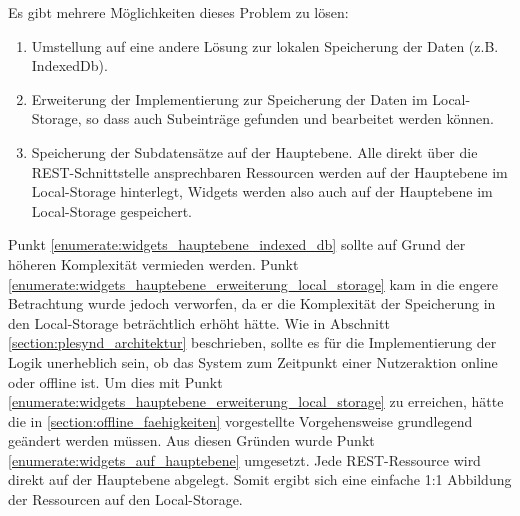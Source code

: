 Es gibt mehrere Möglichkeiten dieses Problem zu lösen:
\begin{enumerate}
 \item\label{enumerate:widgets_hauptebene_indexed_db} Umstellung auf eine andere Lösung zur lokalen Speicherung der Daten (z.B. IndexedDb).
 \item\label{enumerate:widgets_hauptebene_erweiterung_local_storage} Erweiterung der Implementierung zur Speicherung der Daten im Local-Storage, so dass auch Subeinträge gefunden und bearbeitet werden können.
 \item\label{enumerate:widgets_auf_hauptebene} Speicherung der Subdatensätze auf der Hauptebene. Alle direkt über die REST-Schnittstelle ansprechbaren Ressourcen werden auf der Hauptebene im Local-Storage hinterlegt, Widgets werden also auch auf der Hauptebene im Local-Storage gespeichert.
\end{enumerate}
Punkt \ref{enumerate:widgets_hauptebene_indexed_db} sollte auf Grund der höheren Komplexität vermieden werden. Punkt \ref{enumerate:widgets_hauptebene_erweiterung_local_storage} kam in die engere Betrachtung wurde jedoch verworfen, da er die Komplexität der Speicherung in den Local-Storage beträchtlich erhöht hätte. Wie in Abschnitt \ref{section:plesynd_architektur} beschrieben, sollte es für die Implementierung der Logik unerheblich sein, ob das System zum Zeitpunkt einer Nutzeraktion online oder offline ist. Um dies mit Punkt \ref{enumerate:widgets_hauptebene_erweiterung_local_storage} zu erreichen, hätte die in \ref{section:offline_faehigkeiten} vorgestellte Vorgehensweise grundlegend geändert werden müssen. Aus diesen Gründen wurde Punkt \ref{enumerate:widgets_auf_hauptebene} umgesetzt. Jede REST-Ressource wird direkt auf der Hauptebene abgelegt. Somit ergibt sich eine einfache 1:1 Abbildung der Ressourcen auf den Local-Storage. 

